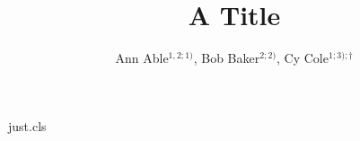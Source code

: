\begin{filecontents*}[overwrite]{just.cls}
\setcounter{email}{1}
\newcommand{\email}[1]{\protected@xdef\@thanks{\@thanks
  \protect\footnotetext[0]{\hspace*{-8pt}\arabic{email})\,{E-mail:\,}#1}}\stepcounter{email}}
\newcommand{\emails}[1]{\footnotetext[0]{\hspace*{-8pt}\arabic{email})\,{E-mail:\,}#1}\stepcounter{email}}
\renewcommand\maketitle{\par\begingroup\newpage\@maketitle\@thanks\endgroup
  \setcounter{footnote}{0}\global\let\thanks\relax\global\let\maketitle\relax
  \global\let\@maketitle\relax\global\let\@thanks\@empty\global\let\@author\@empty\global\let\@title\@empty}
\renewcommand\@maketitle{\begin{center}\let\footnote\thanks{\Large\bf\@title\par}%
  {\normalsize\lineskip .5em\vskip 4mm\begin{tabular}[t]{c}\normalsize\@author\end{tabular}}\end{center}}
\newcommand{\address}[1]{\vspace*{0mm}
  \begin{center}\vskip -5mm\begin{center}{\footnotesize #1}\end{center}\end{center}}
\end{filecontents*}
\documentclass{just}

\title{A Title}
\author{Ann Able$^{1,2;1)}$, \quad Bob Baker$^{2;2)}$,
\quad Cy Cole$^{1;3);\dagger}$}
\maketitle
\address{$^1$ Univ A, Town\\ $^2$ Univ B, City\\ $^3$ Lab C, Place\\ $^\dagger$ Speaker.}
Body.


